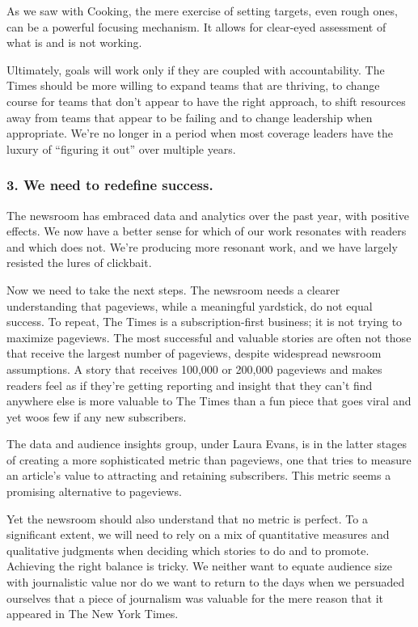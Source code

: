 As we saw with Cooking, the mere exercise of setting targets, even rough
ones, can be a powerful focusing mechanism. It allows for clear-eyed
assessment of what is and is not working.

Ultimately, goals will work only if they are coupled with
accountability. The Times should be more willing to expand teams that
are thriving, to change course for teams that don't appear to have the
right approach, to shift resources away from teams that appear to be
failing and to change leadership when appropriate. We're no longer in a
period when most coverage leaders have the luxury of ``figuring it out''
over multiple years.

\hypertarget{3-we-need-to-redefine-success}{%
\subsubsection{3. We need to redefine
success.}\label{3-we-need-to-redefine-success}}

The newsroom has embraced data and analytics over the past year, with
positive effects. We now have a better sense for which of our work
resonates with readers and which does not. We're producing more resonant
work, and we have largely resisted the lures of clickbait.

Now we need to take the next steps. The newsroom needs a clearer
understanding that pageviews, while a meaningful yardstick, do not equal
success. To repeat, The Times is a subscription-first business; it is
not trying to maximize pageviews. The most successful and valuable
stories are often not those that receive the largest number of
pageviews, despite widespread newsroom assumptions. A story that
receives 100,000 or 200,000 pageviews and makes readers feel as if
they're getting reporting and insight that they can't find anywhere else
is more valuable to The Times than a fun piece that goes viral and yet
woos few if any new subscribers.

The data and audience insights group, under Laura Evans, is in the
latter stages of creating a more sophisticated metric than pageviews,
one that tries to measure an article's value to attracting and retaining
subscribers. This metric seems a promising alternative to pageviews.

Yet the newsroom should also understand that no metric is perfect. To a
significant extent, we will need to rely on a mix of quantitative
measures and qualitative judgments when deciding which stories to do and
to promote. Achieving the right balance is tricky. We neither want to
equate audience size with journalistic value nor do we want to return to
the days when we persuaded ourselves that a piece of journalism was
valuable for the mere reason that it appeared in The New York Times.

